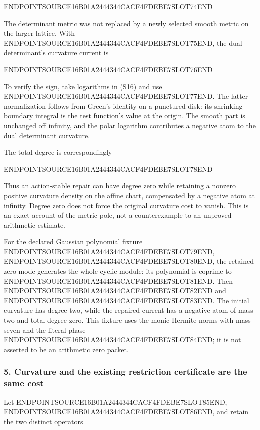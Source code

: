 ENDPOINTSOURCE16B01A2444344CACF4FDEBE7SLOT74END

The determinant metric was not replaced by a newly selected smooth metric on the larger lattice. With ENDPOINTSOURCE16B01A2444344CACF4FDEBE7SLOT75END, the dual determinant's curvature current is

ENDPOINTSOURCE16B01A2444344CACF4FDEBE7SLOT76END

To verify the sign, take logarithms in (S16) and use ENDPOINTSOURCE16B01A2444344CACF4FDEBE7SLOT77END. The latter normalization follows from Green's identity on a punctured disk: its shrinking boundary integral is the test function's value at the origin. The smooth part is unchanged off infinity, and the polar logarithm contributes a negative atom to the dual determinant curvature.

The total degree is correspondingly

ENDPOINTSOURCE16B01A2444344CACF4FDEBE7SLOT78END

Thus an action-stable repair can have degree zero while retaining a nonzero positive curvature density on the affine chart, compensated by a negative atom at infinity. Degree zero does not force the original curvature cost to vanish. This is an exact account of the metric pole, not a counterexample to an unproved arithmetic estimate.

For the declared Gaussian polynomial fixture ENDPOINTSOURCE16B01A2444344CACF4FDEBE7SLOT79END, ENDPOINTSOURCE16B01A2444344CACF4FDEBE7SLOT80END, the retained zero mode generates the whole cyclic module: its polynomial is coprime to ENDPOINTSOURCE16B01A2444344CACF4FDEBE7SLOT81END. Then ENDPOINTSOURCE16B01A2444344CACF4FDEBE7SLOT82END and ENDPOINTSOURCE16B01A2444344CACF4FDEBE7SLOT83END. The initial curvature has degree two, while the repaired current has a negative atom of mass two and total degree zero. This fixture uses the monic Hermite norms with mass seven and the literal phase ENDPOINTSOURCE16B01A2444344CACF4FDEBE7SLOT84END; it is not asserted to be an arithmetic zero packet.

\subsubsection{5. Curvature and the existing restriction certificate are the same cost}\label{endpoint-cc_specialization--curvature-and-the-existing-restriction-certificate-are-the-same-cost}

Let ENDPOINTSOURCE16B01A2444344CACF4FDEBE7SLOT85END, ENDPOINTSOURCE16B01A2444344CACF4FDEBE7SLOT86END, and retain the two distinct operators

